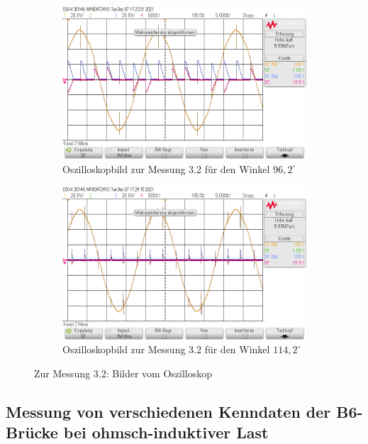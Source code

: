 \documentclass{article}
\begin{document}
\begin{figure}[h]
  \centering
  \begin{subfigure}{.45\textwidth}
    \centering
    \includegraphics[width=\linewidth]{../assets/images/GEP2/32_Winkel962.png}
    \caption{Oszilloskopbild zur Messung 3.2 für den Winkel $96,2^{\circ}$}
  \end{subfigure}
  \begin{subfigure}{.45\textwidth}
    \centering
    \includegraphics[width=\linewidth]{../assets/images/GEP2/32_Winkel1142.png}
    \caption{Oszilloskopbild zur Messung 3.2 für den Winkel $114,2^{\circ}$}
  \end{subfigure}
  \label{fig:31_242}
  \caption{Zur Messung 3.2: Bilder vom Oszilloskop}
\end{figure}

\subsection{Messung von verschiedenen Kenndaten der B6-Brücke bei ohmsch-induktiver Last}
\end{document}
